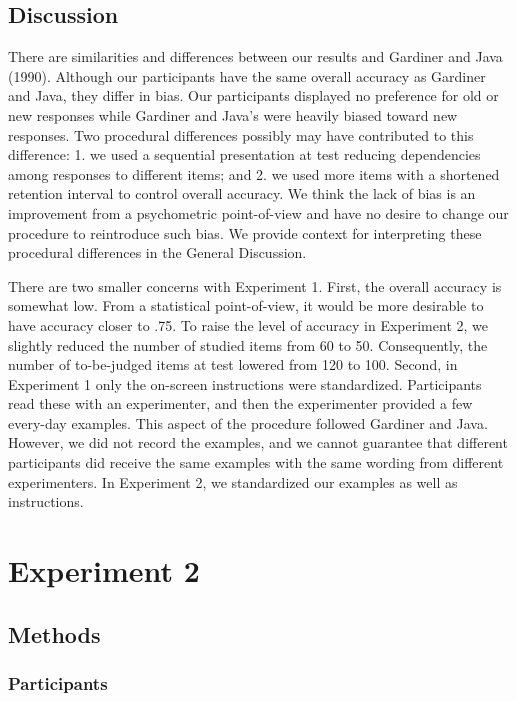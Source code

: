 \documentclass[english,,man,floatsintext]{apa6}
\begin{document}
\hypertarget{discussion}{%
\subsection{Discussion}\label{discussion}}

There are similarities and differences between our results and Gardiner and Java (1990). Although our participants have the same overall accuracy as Gardiner and Java, they differ in bias. Our participants displayed no preference for old or new responses while Gardiner and Java's were heavily biased toward new responses. Two procedural differences possibly may have contributed to this difference: 1. we used a sequential presentation at test reducing dependencies among responses to different items; and 2. we used more items with a shortened retention interval to control overall accuracy. We think the lack of bias is an improvement from a psychometric point-of-view and have no desire to change our procedure to reintroduce such bias. We provide context for interpreting these procedural differences in the General Discussion.

There are two smaller concerns with Experiment 1. First, the overall accuracy is somewhat low. From a statistical point-of-view, it would be more desirable to have accuracy closer to .75.
To raise the level of accuracy in Experiment 2, we slightly reduced the number of studied items from 60 to 50. Consequently, the number of to-be-judged items at test lowered from 120 to 100. Second, in Experiment 1 only the on-screen instructions were standardized. Participants read these with an experimenter, and then the experimenter provided a few every-day examples. This aspect of the procedure followed Gardiner and Java. However, we did not record the examples, and we cannot guarantee that different participants did receive the same examples with the same wording from different experimenters. In Experiment 2, we standardized our examples as well as instructions.

\hypertarget{experiment-2}{%
\section{Experiment 2}\label{experiment-2}}

\hypertarget{methods-1}{%
\subsection{Methods}\label{methods-1}}

\hypertarget{participants}{%
\subsubsection{Participants}\label{participants}}
\end{document}
